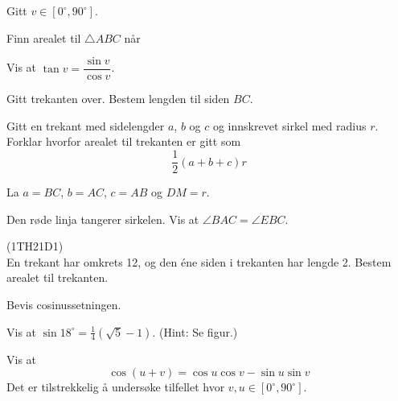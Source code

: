




\opgt

Gitt $ v\in [0^\circ, 90^\circ] $.

Finn arealet til $ \triangle ABC $ når



Vis at $ \tan v = \dfrac{\sin v}{\cos v}  $.

\newpage
\nes

Gitt trekanten over. Bestem lengden til siden $ BC $.

Gitt en trekant med sidelengder $ a $, $ b $ og $ c $ og innskrevet sirkel med radius $ r $. Forklar hvorfor arealet til trekanten er gitt som 
\[ \frac{1}{2}(a+b+c)r \]

La $ a=BC $, $ b=AC $, $ c=AB $ og $ DM=r $.

\newpage
{}
Den røde linja tangerer sirkelen. Vis at $ \angle BAC=\angle EBC $.
\newpage

 (1TH21D1)\\ %
En trekant har omkrets 12, og den éne siden i trekanten har lengde 2. Bestem arealet til trekanten.

Bevis cosinussetningen.

Vis at $ \sin 18^\circ=\frac{1}{4}(\sqrt{5}-1) $. (Hint: Se figur.)

Vis at
\[ \cos(u+v)= \cos u\cos v-\sin u \sin v \]
Det er tilstrekkelig å undersøke tilfellet hvor $ v,u \in [0^\circ, 90^\circ] $.



